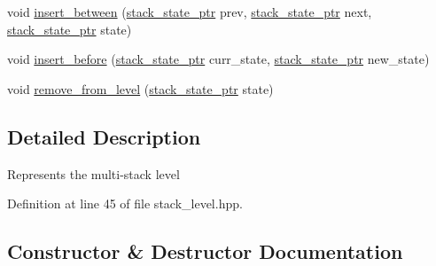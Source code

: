 \begin{DoxyCompactItemize}
\item 
void \hyperlink{classuva_1_1smt_1_1bpbd_1_1server_1_1decoder_1_1stack_1_1stack__level_a0055e713c18c42277d21b34d214a5ff0}{insert\+\_\+between} (\hyperlink{namespaceuva_1_1smt_1_1bpbd_1_1server_1_1decoder_1_1stack_ab08047a5fae45b1c4311bd5d5aa2c4fc}{stack\+\_\+state\+\_\+ptr} prev, \hyperlink{namespaceuva_1_1smt_1_1bpbd_1_1server_1_1decoder_1_1stack_ab08047a5fae45b1c4311bd5d5aa2c4fc}{stack\+\_\+state\+\_\+ptr} next, \hyperlink{namespaceuva_1_1smt_1_1bpbd_1_1server_1_1decoder_1_1stack_ab08047a5fae45b1c4311bd5d5aa2c4fc}{stack\+\_\+state\+\_\+ptr} state)
\item 
void \hyperlink{classuva_1_1smt_1_1bpbd_1_1server_1_1decoder_1_1stack_1_1stack__level_a34db813fc46305cf50e782f700f6b71b}{insert\+\_\+before} (\hyperlink{namespaceuva_1_1smt_1_1bpbd_1_1server_1_1decoder_1_1stack_ab08047a5fae45b1c4311bd5d5aa2c4fc}{stack\+\_\+state\+\_\+ptr} curr\+\_\+state, \hyperlink{namespaceuva_1_1smt_1_1bpbd_1_1server_1_1decoder_1_1stack_ab08047a5fae45b1c4311bd5d5aa2c4fc}{stack\+\_\+state\+\_\+ptr} new\+\_\+state)
\item 
void \hyperlink{classuva_1_1smt_1_1bpbd_1_1server_1_1decoder_1_1stack_1_1stack__level_a07981c21a1c88317159af94b53177fdc}{remove\+\_\+from\+\_\+level} (\hyperlink{namespaceuva_1_1smt_1_1bpbd_1_1server_1_1decoder_1_1stack_ab08047a5fae45b1c4311bd5d5aa2c4fc}{stack\+\_\+state\+\_\+ptr} state)
\end{DoxyCompactItemize}


\subsection{Detailed Description}
Represents the multi-\/stack level 

Definition at line 45 of file stack\+\_\+level.\+hpp.



\subsection{Constructor \& Destructor Documentation}
\hypertarget{classuva_1_1smt_1_1bpbd_1_1server_1_1decoder_1_1stack_1_1stack__level_a0b4a0804fe2e2ff95adcea7524bde943}{}
